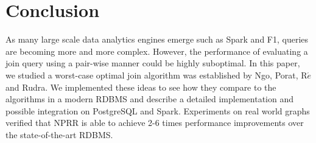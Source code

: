 \section{Conclusion}


As many large scale data analytics engines emerge such as Spark and F1, queries are becoming more and more complex. However, the performance of evaluating a join query using a pair-wise manner could be highly suboptimal. In this paper, we studied a worst-case optimal join algorithm was established by Ngo, Porat, R$\acute{e}$ and Rudra. We implemented these ideas to see how they compare to the algorithms in a modern RDBMS and describe a detailed implementation and possible integration on PostgreSQL and Spark. Experiments on real world graphs verified that NPRR is able to achieve 2-6 times performance improvements over the state-of-the-art RDBMS.
